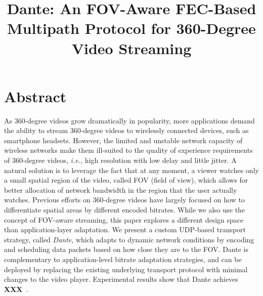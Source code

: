 \documentclass{apnet18}
\newcommand{\ie}{{\it i.e.,}\xspace}
\newcommand{\fillme}{{\bf XXX}~}
\begin{document}
 {}
\date{}


\title{Dante: An FOV-Aware FEC-Based Multipath Protocol for 360-Degree Video Streaming}

\maketitle



	
\section*{Abstract}
As 360-degree videos grow dramatically in popularity, more 
applications demand the ability to stream 360-degree videos to 
wirelessly connected devices, such as smartphone headsets. However, 
the limited and unstable network capacity of wireless networks make 
them ill-suited to the quality of experience requirements of 
360-degree videos, \ie high resolution with low delay and little 
jitter. A natural solution is to leverage the fact that at any 
moment, a viewer watches only a small spatial region of the video, 
called FOV (field of view), which allows for better allocation of 
network bandwidth in the region that the user actually watches. 
Previous efforts on 360-degree videos have largely focused on how to 
differentiate spatial areas by different encoded bitrates. While we 
also use the concept of FOV-aware streaming, this paper explores a 
different design space than application-layer adaptation. We present 
a custom UDP-based transport strategy, called {\em Dante}, which 
adapts to dynamic network conditions by encoding and scheduling data 
packets based on how close they are to the FOV. Dante is 
complementary to application-level bitrate adaptation strategies, and
can be deployed by replacing the existing underlying transport 
protocol with minimal changes to the video player. Experimental 
results show that Dante achieves \fillme.
\end{document}
